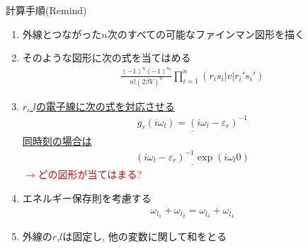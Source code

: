 \documentclass[dvipdfmx,10pt]{beamer}
\begin{document}
\begin{frame}{計算手順(Remind)}
    \footnotesize
    \begin{enumerate}
        \item 外線とつながった$n$次のすべての可能なファインマン図形を描く
        \item そのような図形に次の式を当てはめる
        \begin{align*}
            \frac{(-1)^n(-1)^{n_l}}{n!(2\beta V)^n}\prod_{i=1}^{n}\left(r_is_i|v|r_i's_i'\right)
        \end{align*}
        \item \underline{$r$, $l$の電子線に次の式を対応させる}
        \begin{align*}
            \underline{g_r(i\omega_l) = (i\omega_l-\varepsilon_r)^{-1}}
        \end{align*}
        \underline{同時刻の場合は}
        \begin{align*}
            \underline{(i\omega_l-\varepsilon_r)^{-1}\exp(i\omega_l0)}
        \end{align*}
        \textcolor{red}{$\rightarrow$どの図形が当てはまる?}
        \item エネルギー保存則を考慮する
        \begin{align*}
            \omega_{l_1} + \omega_{l_2} = \omega_{l_3} + \omega_{l_4}
        \end{align*}
        \item 外線の$r$,$l$は固定し, 他の変数に関して和をとる
    \end{enumerate}
    \normalsize
\end{frame}
\end{document}
